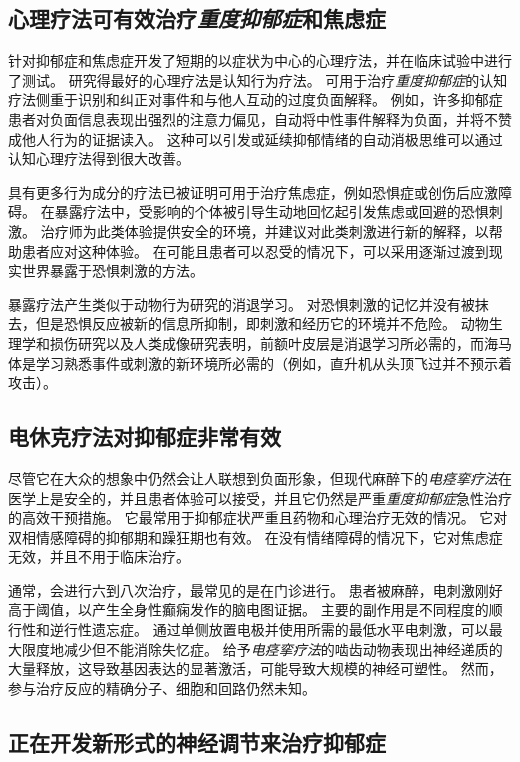 \subsection{心理疗法可有效治疗\textit{重度抑郁症}和焦虑症}

针对抑郁症和焦虑症开发了短期的以症状为中心的心理疗法，并在临床试验中进行了测试。
研究得最好的心理疗法是认知行为疗法。
可用于治疗\textit{重度抑郁症}的认知疗法侧重于识别和纠正对事件和与他人互动的过度负面解释。
例如，许多抑郁症患者对负面信息表现出强烈的注意力偏见，自动将中性事件解释为负面，并将不赞成他人行为的证据读入。
这种可以引发或延续抑郁情绪的自动消极思维可以通过认知心理疗法得到很大改善。


具有更多行为成分的疗法已被证明可用于治疗焦虑症，例如恐惧症或创伤后应激障碍。
在暴露疗法中，受影响的个体被引导生动地回忆起引发焦虑或回避的恐惧刺激。
治疗师为此类体验提供安全的环境，并建议对此类刺激进行新的解释，以帮助患者应对这种体验。
在可能且患者可以忍受的情况下，可以采用逐渐过渡到现实世界暴露于恐惧刺激的方法。


暴露疗法产生类似于动物行为研究的消退学习。
对恐惧刺激的记忆并没有被抹去，但是恐惧反应被新的信息所抑制，即刺激和经历它的环境并不危险。
动物生理学和损伤研究以及人类成像研究表明，前额叶皮层是消退学习所必需的，而海马体是学习熟悉事件或刺激的新环境所必需的（例如，直升机从头顶飞过并不预示着攻击）。



\subsection{电休克疗法对抑郁症非常有效}

尽管它在大众的想象中仍然会让人联想到负面形象，但现代麻醉下的\textit{电痉挛疗法}在医学上是安全的，并且患者体验可以接受，并且它仍然是严重\textit{重度抑郁症}急性治疗的高效干预措施。
它最常用于抑郁症状严重且药物和心理治疗无效的情况。
它对双相情感障碍的抑郁期和躁狂期也有效。
在没有情绪障碍的情况下，它对焦虑症无效，并且不用于临床治疗。


通常，会进行六到八次治疗，最常见的是在门诊进行。
患者被麻醉，电刺激刚好高于阈值，以产生全身性癫痫发作的脑电图证据。
主要的副作用是不同程度的顺行性和逆行性遗忘症。
通过单侧放置电极并使用所需的最低水平电刺激，可以最大限度地减少但不能消除失忆症。
给予\textit{电痉挛疗法}的啮齿动物表现出神经递质的大量释放，这导致基因表达的显著激活，可能导致大规模的神经可塑性。
然而，参与治疗反应的精确分子、细胞和回路仍然未知。



\subsection{正在开发新形式的神经调节来治疗抑郁症}

